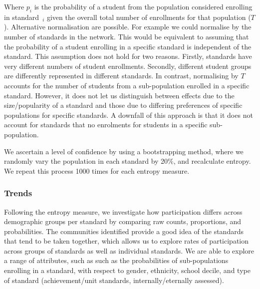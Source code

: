 Where $p_i$ is the probability of a student from the population considered enrolling in standard~$_i$ given the overall total number of enrollments for that population ($T$). Alternative normalisation are possible. For example we could normalise by the number of standards in the network. This would be equivalent to assuming that the probability of a student enrolling in a specific standard is independent of the standard. This assumption does not hold for two reasons. Firstly, standards have very different numbers of student enrollments. Secondly, different student groups are differently represented in different standards. In contrast, normalising by $T$ accounts for the number of students from a sub-population enrolled in a specific standard. However, it does not let us distinguish between effects due to the size/popularity of a standard and those due to differing preferences of specific populations for specific standards. A downfall of this approach is that it does not account for standards that no enrolments for students in a specific sub-population.

We ascertain a level of confidence by using a bootstrapping method, where we randomly vary the population in each standard by 20\%, and recalculate entropy. We repeat this process 1000 times for each entropy measure. 

\subsubsection{Trends}
Following the entropy measure, we investigate how participation differs across demographic groups per standard by comparing raw counts, proportions, and probabilities. The communities identified provide a good idea of the standards that tend to be taken together, which allows us to explore rates of participation across groups of standards as well as individual standards. We are able to explore a range of attributes, such as such as the probabilities of sub-populations enrolling in a standard, with respect to gender, ethnicity, school decile, and type of standard (achievement/unit standards, internally/eternally assessed).  

